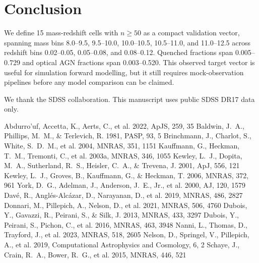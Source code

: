 \documentclass[twocolumn]{aastex631}
\begin{document}
\section{Conclusion}\label{sec:conclusion}
We define 15 mass-redshift cells with $n \geq 50$ as a compact validation vector, spanning mass bins 8.0--9.5, 9.5--10.0, 10.0--10.5, 10.5--11.0, and 11.0--12.5 across redshift bins 0.02--0.05, 0.05--0.08, and 0.08--0.12. Quenched fractions span 0.005--0.729 and optical AGN fractions span 0.003--0.520. This observed target vector is useful for simulation forward modelling, but it still requires mock-observation pipelines before any model comparison can be claimed.

\acknowledgments
We thank the SDSS collaboration. This manuscript uses public SDSS DR17 data only.


\begin{thebibliography}{}
 Abdurro'uf, Accetta, K., Aerts, C., et al. 2022, ApJS, 259, 35
 Baldwin, J.~A., Phillips, M.~M., \& Terlevich, R. 1981, PASP, 93, 5
 Brinchmann, J., Charlot, S., White, S.~D.~M., et al. 2004, MNRAS, 351, 1151
 Kauffmann, G., Heckman, T.~M., Tremonti, C., et al. 2003a, MNRAS, 346, 1055
 Kewley, L.~J., Dopita, M.~A., Sutherland, R.~S., Heisler, C.~A., \& Trevena, J. 2001, ApJ, 556, 121
 Kewley, L.~J., Groves, B., Kauffmann, G., \& Heckman, T. 2006, MNRAS, 372, 961
 York, D.~G., Adelman, J., Anderson, J.~E., Jr., et al. 2000, AJ, 120, 1579
 Dav\'e, R., Angl\'es-Alc\'azar, D., Narayanan, D., et al. 2019, MNRAS, 486, 2827
 Donnari, M., Pillepich, A., Nelson, D., et al. 2021, MNRAS, 506, 4760
 Dubois, Y., Gavazzi, R., Peirani, S., \& Silk, J. 2013, MNRAS, 433, 3297
 Dubois, Y., Peirani, S., Pichon, C., et al. 2016, MNRAS, 463, 3948
 Nanni, L., Thomas, D., Trayford, J., et al. 2023, MNRAS, 518, 2605
 Nelson, D., Springel, V., Pillepich, A., et al. 2019, Computational Astrophysics and Cosmology, 6, 2
 Schaye, J., Crain, R.~A., Bower, R.~G., et al. 2015, MNRAS, 446, 521
\end{thebibliography}
\end{document}
